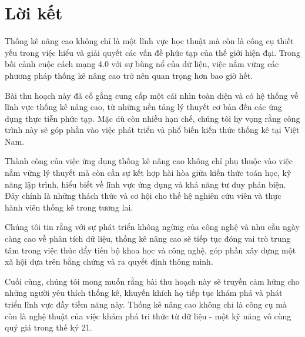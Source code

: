 \section*{Lời kết}

Thống kê nâng cao không chỉ là một lĩnh vực học thuật mà còn là công cụ thiết yếu trong việc hiểu và giải quyết các vấn đề phức tạp của thế giới hiện đại. Trong bối cảnh cuộc cách mạng 4.0 với sự bùng nổ của dữ liệu, việc nắm vững các phương pháp thống kê nâng cao trở nên quan trọng hơn bao giờ hết.

Bài thu hoạch này đã cố gắng cung cấp một cái nhìn toàn diện và có hệ thống về lĩnh vực thống kê nâng cao, từ những nền tảng lý thuyết cơ bản đến các ứng dụng thực tiễn phức tạp. Mặc dù còn nhiều hạn chế, chúng tôi hy vọng rằng công trình này sẽ góp phần vào việc phát triển và phổ biến kiến thức thống kê tại Việt Nam.

Thành công của việc ứng dụng thống kê nâng cao không chỉ phụ thuộc vào việc nắm vững lý thuyết mà còn cần sự kết hợp hài hòa giữa kiến thức toán học, kỹ năng lập trình, hiểu biết về lĩnh vực ứng dụng và khả năng tư duy phản biện. Đây chính là những thách thức và cơ hội cho thế hệ nghiên cứu viên và thực hành viên thống kê trong tương lai.

Chúng tôi tin rằng với sự phát triển không ngừng của công nghệ và nhu cầu ngày càng cao về phân tích dữ liệu, thống kê nâng cao sẽ tiếp tục đóng vai trò trung tâm trong việc thúc đẩy tiến bộ khoa học và công nghệ, góp phần xây dựng một xã hội dựa trên bằng chứng và ra quyết định thông minh.

Cuối cùng, chúng tôi mong muốn rằng bài thu hoạch này sẽ truyền cảm hứng cho những người yêu thích thống kê, khuyến khích họ tiếp tục khám phá và phát triển lĩnh vực đầy tiềm năng này. Thống kê nâng cao không chỉ là công cụ mà còn là nghệ thuật của việc khám phá tri thức từ dữ liệu - một kỹ năng vô cùng quý giá trong thế kỷ 21.